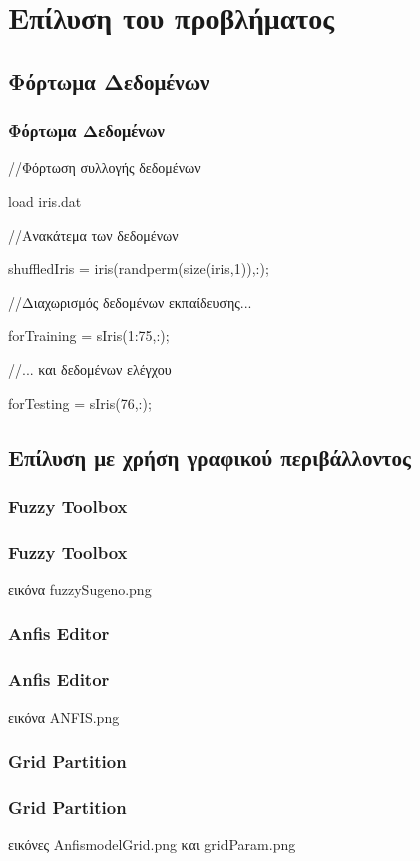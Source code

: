 \documentclass[xetex,serif,mathserif,14pt]{beamer}
\begin{document}

\section{Επίλυση του προβλήματος}

\subsection{Φόρτωμα Δεδομένων}

\begin{frame}
\frametitle{Φόρτωμα Δεδομένων}
    //Φόρτωση συλλογής δεδομένων
    
    load iris.dat 
    
    //Ανακάτεμα  των δεδομένων
    
    shuffledIris = iris(randperm(size(iris,1)),:);
    
    //Διαχωρισμός δεδομένων εκπαίδευσης...
    
    forTraining = sIris(1:75,:);
    
    //... και δεδομένων ελέγχου
    
    forTesting = sIris(76,:);
\end{frame}

\subsection{Επίλυση με χρήση γραφικού περιβάλλοντος}

\subsubsection{Fuzzy Toolbox}
\begin{frame}
\frametitle{Fuzzy Toolbox}
εικόνα fuzzySugeno.png
\end{frame}

\subsubsection{Anfis Editor}
\begin{frame}
\frametitle{Anfis Editor}
εικόνα ANFIS.png
\end{frame}

\subsubsection{Grid Partition}
\begin{frame}
\frametitle{Grid Partition}
εικόνες AnfismodelGrid.png και gridParam.png
\end{frame}
\end{document}
